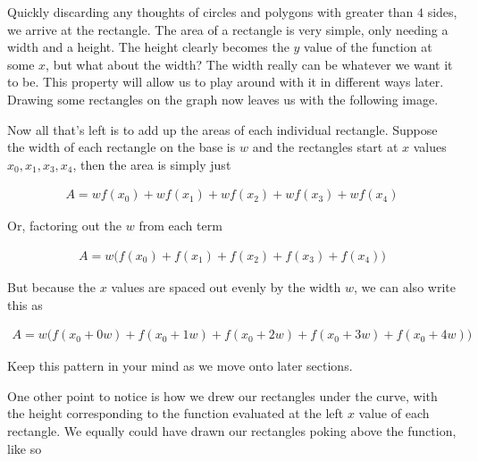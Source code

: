 Quickly discarding any thoughts of circles and polygons with greater than \( 4 \) sides, we arrive at the rectangle. The area of a rectangle is very simple, only needing a width and a height. The height clearly becomes the \( y \) value of the function at some \( x \), but what about the width? The width really can be whatever we want it to be. This property will allow us to play around with it in different ways later. Drawing some rectangles on the graph now leaves us with the following image.

\begin{figure}[H]
    \centering
    
\end{figure}

Now all that's left is to add up the areas of each individual rectangle. Suppose the width of each rectangle on the base is \( w \) and the rectangles start at \( x \) values \( x_0, x_1, x_3, x_4 \), then the area is simply just

\begin{align*}
    A = wf \left( x_0 \right) + w f \left( x_1 \right) + w f \left( x_2 \right) + w f \left( x_3 \right) + w f \left( x_4 \right)
\end{align*}

Or, factoring out the \( w \) from each term

\begin{align*}
    A = w \Big( f \left( x_0 \right) + f \left( x_1 \right) + f \left( x_2 \right) + f \left( x_3 \right) + f \left( x_4 \right) \Big)
\end{align*}

But because the \( x \) values are spaced out evenly by the width \( w \), we can also write this as

\begin{align*}
    A = w \Big( f \left( x_0 + 0w \right) + f \left( x_0 + 1w \right) + f \left( x_0 + 2w \right) + f \left( x_0 + 3w \right) + f \left( x_0 + 4w \right) \Big)
\end{align*}

Keep this pattern in your mind as we move onto later sections.

One other point to notice is how we drew our rectangles under the curve, with the height corresponding to the function evaluated at the left \( x \) value of each rectangle. We equally could have drawn our rectangles poking above the function, like so

\begin{figure}[H]
    \centering
    
\end{figure}

